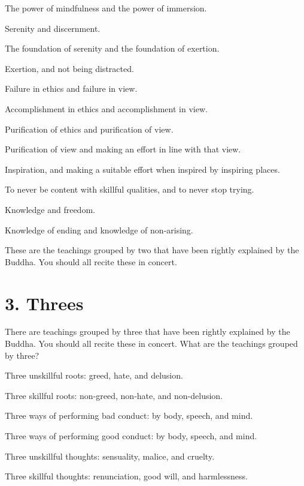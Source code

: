 \documentclass[12pt,openany]{book}%
\begin{document}
The power of mindfulness and the power of immersion. 

Serenity and discernment. 

The foundation of serenity and the foundation of exertion. 

Exertion, and not being distracted. 

Failure in ethics and failure in view. 

Accomplishment in ethics and accomplishment in view. 

Purification of ethics and purification of view. 

Purification of view and making an effort in line with that view. 

Inspiration, and making a suitable effort when inspired by inspiring places. 

To never be content with skillful qualities, and to never stop trying. 

Knowledge and freedom. 

Knowledge of ending and knowledge of non-arising. 

These are the teachings grouped by two that have been rightly explained by the Buddha. You should all recite these in concert. 

\section*{3. Threes }

There are teachings grouped by three that have been rightly explained by the Buddha. You should all recite these in concert. What are the teachings grouped by three? 

Three unskillful roots: greed, hate, and delusion. 

Three skillful roots: non-greed, non-hate, and non-delusion. 

Three ways of performing bad conduct: by body, speech, and mind. 

Three ways of performing good conduct: by body, speech, and mind. 

Three unskillful thoughts: sensuality, malice, and cruelty. 

Three skillful thoughts: renunciation, good will, and harmlessness. 
\end{document}
